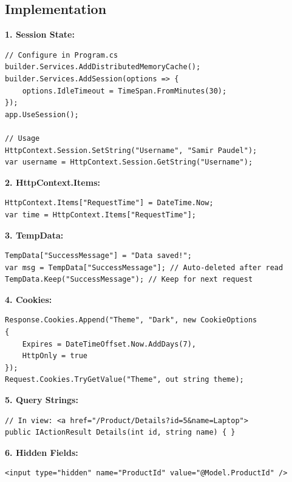 \documentclass[10pt,a4paper]{article}
\begin{document}
\subsection*{Implementation}

\textbf{1. Session State:}
\begin{lstlisting}[basicstyle=\ttfamily\tiny]
// Configure in Program.cs
builder.Services.AddDistributedMemoryCache();
builder.Services.AddSession(options => {
    options.IdleTimeout = TimeSpan.FromMinutes(30);
});
app.UseSession();

// Usage
HttpContext.Session.SetString("Username", "Samir Paudel");
var username = HttpContext.Session.GetString("Username");
\end{lstlisting}

\textbf{2. HttpContext.Items:}
\begin{lstlisting}[basicstyle=\ttfamily\tiny]
HttpContext.Items["RequestTime"] = DateTime.Now;
var time = HttpContext.Items["RequestTime"];
\end{lstlisting}

\textbf{3. TempData:}
\begin{lstlisting}[basicstyle=\ttfamily\tiny]
TempData["SuccessMessage"] = "Data saved!";
var msg = TempData["SuccessMessage"]; // Auto-deleted after read
TempData.Keep("SuccessMessage"); // Keep for next request
\end{lstlisting}

\textbf{4. Cookies:}
\begin{lstlisting}[basicstyle=\ttfamily\tiny]
Response.Cookies.Append("Theme", "Dark", new CookieOptions
{
    Expires = DateTimeOffset.Now.AddDays(7),
    HttpOnly = true
});
Request.Cookies.TryGetValue("Theme", out string theme);
\end{lstlisting}

\textbf{5. Query Strings:}
\begin{lstlisting}[basicstyle=\ttfamily\tiny]
// In view: <a href="/Product/Details?id=5&name=Laptop">
public IActionResult Details(int id, string name) { }
\end{lstlisting}

\textbf{6. Hidden Fields:}
\begin{lstlisting}[basicstyle=\ttfamily\tiny]
<input type="hidden" name="ProductId" value="@Model.ProductId" />
\end{lstlisting}
\end{document}

